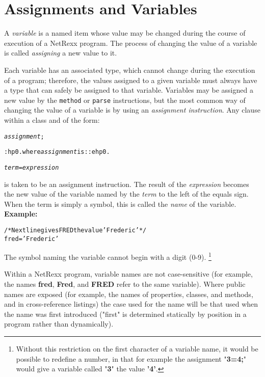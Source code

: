 \chapter{Assignments and Variables}\label{"id"}
\index{,}
 A \emph{variable} is a named item whose value may be changed
during the course of execution of a NetRexx program.
The process of changing the value of a variable is called
\emph{assigning} a new value to it.
 
Each variable has an associated type, which cannot change during the
execution of a program; therefore, the values assigned to a given
variable must always have a type that can safely be assigned to that
variable.
 Variables may be assigned a new value by the \texttt{method} or
\texttt{parse} instructions, but the most common way of changing the
value of a variable is by using an \emph{assignment instruction}.
Any clause within a class and of the form:
\begin{shaded}
\begin{alltt}
\emph{assignment};

:hp0.where \emph{assignment} is::ehp0.

    \emph{term}=\emph{expression}
\end{alltt}
\end{shaded}
is taken to be an assignment instruction.
The result of the \emph{expression} becomes the new value of the
variable named by the \emph{term} to the left of the equals sign.
When the term is simply a symbol, this is called the \emph{name} of
the variable.
 \textbf{Example:}
\begin{alltt}
/* Next line gives FRED the value 'Frederic' */
fred='Frederic'
\end{alltt}
The symbol naming the variable cannot begin with a digit (0-9).
\footnote{
Without this restriction on the first character of a variable name,
it would be possible to redefine a number, in that for example the
assignment "\textbf{3=4;}" would give a variable called
"\textbf{3}" the value \textbf{'4'}.
}
 
Within a NetRexx program, variable names are not case-sensitive (for
example, the names \textbf{fred}, \textbf{Fred}, and \textbf{FRED}
refer to the same variable).
Where public names are exposed (for example, the names of properties,
classes, and methods, and in cross-reference listings) the case used for
the name will be that used when the name was first introduced
("first" is determined statically by position in a program rather
than dynamically).
 
